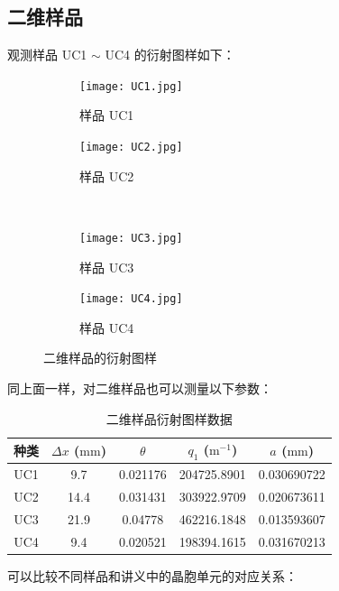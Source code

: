 \documentclass{customDoc}
\begin{document}
\subsection{二维样品}

观测样品 UC1 $\sim$ UC4 的衍射图样如下：

\begin{figure}[H]
    \begin{subfigure}[b]{0.45\textwidth}
        \texttt{[image: UC1.jpg]}
        \caption{样品 UC1}
        \label{fig:2D_1}
    \end{subfigure}
    \hfill
    \begin{subfigure}[b]{0.45\textwidth}
        \texttt{[image: UC2.jpg]}
        \caption{样品 UC2}
        \label{fig:2D_2}
    \end{subfigure}
    \\
    \begin{subfigure}[b]{0.45\textwidth}
        \texttt{[image: UC3.jpg]}
        \caption{样品 UC3}
        \label{fig:2D_3}
    \end{subfigure}
    \hfill
    \begin{subfigure}[b]{0.45\textwidth}
        \texttt{[image: UC4.jpg]}
        \caption{样品 UC4}
        \label{fig:2D_4}
    \end{subfigure}
    \caption{二维样品的衍射图样}
    \label{fig:2D}
\end{figure}

同上面一样，对二维样品也可以测量以下参数：

\begin{table}[H]
  \centering
    \begin{tabular}{|c|c|c|c|c|}
    \hline
    种类    & $\Delta x$ ($\si{\milli\metre}$) & $\theta$     &  $q_1$ ($\si{\metre}^{-1}$) & $a$ ($\si{\milli\metre}$) \\
    \hline
    UC1   & 9.7   & 0.021176 & 204725.8901 & 0.030690722 \\
    \hline
    UC2   & 14.4  & 0.031431 & 303922.9709 & 0.020673611 \\
    \hline
    UC3   & 21.9  & 0.04778 & 462216.1848 & 0.013593607 \\
    \hline
    UC4   & 9.4   & 0.020521 & 198394.1615 & 0.031670213 \\
    \hline
    \end{tabular}%
    \caption{二维样品衍射图样数据}
  \label{tab:2}%
\end{table}%

可以比较不同样品和讲义中的晶胞单元的对应关系：\newline
\end{document}
